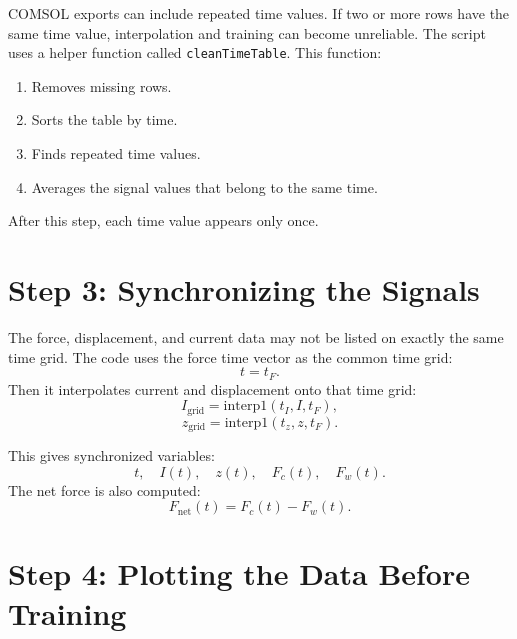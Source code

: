 \documentclass[11pt]{article}
\begin{document}
COMSOL exports can include repeated time values. If two or more rows have the same time value, interpolation and training can become unreliable. The script uses a helper function called \texttt{cleanTimeTable}. This function:
\begin{enumerate}[leftmargin=1.2cm]
    \item Removes missing rows.
    \item Sorts the table by time.
    \item Finds repeated time values.
    \item Averages the signal values that belong to the same time.
\end{enumerate}

After this step, each time value appears only once.

\section{Step 3: Synchronizing the Signals}

The force, displacement, and current data may not be listed on exactly the same time grid. The code uses the force time vector as the common time grid:
\[
    t = t_F.
\]
Then it interpolates current and displacement onto that time grid:
\begin{equation}
    I_{\mathrm{grid}} = \mathrm{interp1}(t_I, I, t_F),
\end{equation}
\begin{equation}
    z_{\mathrm{grid}} = \mathrm{interp1}(t_z, z, t_F).
\end{equation}

This gives synchronized variables:
\[
    t,\quad I(t),\quad z(t),\quad F_c(t),\quad F_w(t).
\]
The net force is also computed:
\begin{equation}
    F_{\mathrm{net}}(t) = F_c(t) - F_w(t).
\end{equation}

\section{Step 4: Plotting the Data Before Training}
\end{document}
